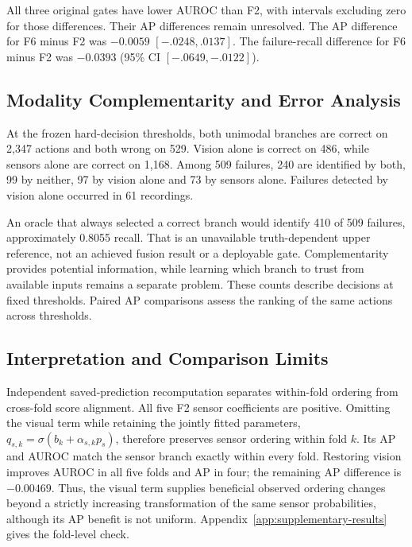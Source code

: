 All three original gates have lower AUROC than F2, with intervals excluding zero for
those differences. Their AP differences remain unresolved. The AP difference for F6
minus F2 was $-0.0059$ $[-.0248,.0137]$. The failure-recall difference for F6 minus F2
was $-0.0393$ (95\% CI $[-.0649,-.0122]$).

\subsection{Modality Complementarity and Error Analysis}
At the frozen hard-decision thresholds, both unimodal branches are correct on 2,347
actions and both wrong on 529. Vision alone is correct on 486, while sensors alone are
correct on 1,168. Among 509 failures, 240 are identified by both, 99 by neither, 97 by
vision alone and 73 by sensors alone. Failures detected by vision alone occurred in 61
recordings.

An oracle that always selected a correct branch would identify 410 of 509 failures,
approximately 0.8055 recall. That is an unavailable truth-dependent upper reference, not
an achieved fusion result or a deployable gate. Complementarity provides potential
information, while learning which branch to trust from available inputs remains a
separate problem. These counts describe decisions at fixed thresholds. Paired AP
comparisons assess the ranking of the same actions across thresholds.

\subsection{Interpretation and Comparison Limits}
Independent saved-prediction recomputation separates within-fold ordering from
cross-fold score alignment. All five F2 sensor coefficients are positive. Omitting the
visual term while retaining the jointly fitted parameters,
$q_{s,k}=\sigma(b_k+\alpha_{s,k}p_s)$, therefore preserves sensor ordering within fold
$k$. Its AP and AUROC match the sensor branch exactly within every fold. Restoring
vision improves AUROC in all five folds and AP in four; the remaining AP difference is
$-0.00469$. Thus, the visual term supplies beneficial observed ordering changes beyond a
strictly increasing transformation of the same sensor probabilities, although its AP
benefit is not uniform. Appendix~\ref{app:supplementary-results} gives the fold-level
check.

